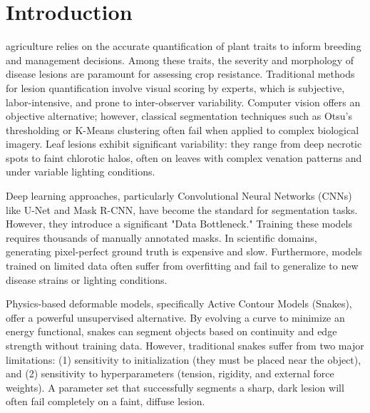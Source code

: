 \documentclass[journal]{IEEEtran}
\begin{document}
\section{Introduction}
 agriculture relies on the accurate quantification of plant traits to inform breeding and management decisions. Among these traits, the severity and morphology of disease lesions are paramount for assessing crop resistance. Traditional methods for lesion quantification involve visual scoring by experts, which is subjective, labor-intensive, and prone to inter-observer variability. Computer vision offers an objective alternative; however, classical segmentation techniques such as Otsu's thresholding or K-Means clustering often fail when applied to complex biological imagery. Leaf lesions exhibit significant variability: they range from deep necrotic spots to faint chlorotic halos, often on leaves with complex venation patterns and under variable lighting conditions.

Deep learning approaches, particularly Convolutional Neural Networks (CNNs) like U-Net and Mask R-CNN, have become the standard for segmentation tasks. However, they introduce a significant "Data Bottleneck." Training these models requires thousands of manually annotated masks. In scientific domains, generating pixel-perfect ground truth is expensive and slow. Furthermore, models trained on limited data often suffer from overfitting and fail to generalize to new disease strains or lighting conditions.

Physics-based deformable models, specifically Active Contour Models (Snakes), offer a powerful unsupervised alternative. By evolving a curve to minimize an energy functional, snakes can segment objects based on continuity and edge strength without training data. However, traditional snakes suffer from two major limitations: (1) sensitivity to initialization (they must be placed near the object), and (2) sensitivity to hyperparameters (tension, rigidity, and external force weights). A parameter set that successfully segments a sharp, dark lesion will often fail completely on a faint, diffuse lesion.
\end{document}
